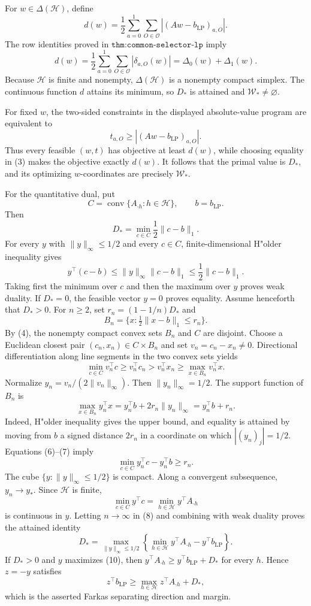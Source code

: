 For \(w\in\Delta(\mathcal H)\), define
\[
d(w)=\frac12\sum_{a=0}^1\sum_{O\in\mathcal O}|(Aw-b_{\mathrm{LP}})_{a,O}|.
\tag{1}
\]
The row identities proved in \(\texttt{thm:common-selector-lp}\) imply
\[
d(w)=\frac12\sum_{a=0}^1\sum_{O\in\mathcal O}|\delta_{a,O}(w)|=\Delta_0(w)+\Delta_1(w).
\tag{2}
\]
Because \(\mathcal H\) is finite and nonempty, \(\Delta(\mathcal H)\) is a nonempty compact simplex. The continuous function \(d\) attains its minimum, so \(D_*\) is attained and \(\mathcal W_*\ne\varnothing\).

For fixed \(w\), the two-sided constraints in the displayed absolute-value program are equivalent to
\[
t_{a,O}\ge |(Aw-b_{\mathrm{LP}})_{a,O}|.
\tag{3}
\]
Thus every feasible \((w,t)\) has objective at least \(d(w)\), while choosing equality in (3) makes the objective exactly \(d(w)\). It follows that the primal value is \(D_*\), and its optimizing \(w\)-coordinates are precisely \(\mathcal W_*\).

For the quantitative dual, put
\[
C=\operatorname{conv}\{A_{\cdot h}:h\in\mathcal H\},\qquad b=b_{\mathrm{LP}}.
\]
Then
\[
D_*=\min_{c\in C}\frac12\lVert c-b\rVert_1.
\tag{4}
\]
For every \(y\) with \(\lVert y\rVert_\infty\le1/2\) and every \(c\in C\), finite-dimensional H"older inequality gives
\[
y^\top(c-b)\le\lVert y\rVert_\infty\lVert c-b\rVert_1\le\frac12\lVert c-b\rVert_1.
\tag{5}
\]
Taking first the minimum over \(c\) and then the maximum over \(y\) proves weak duality. If \(D_*=0\), the feasible vector \(y=0\) proves equality. Assume henceforth that \(D_*>0\). For \(n\ge2\), set \(r_n=(1-1/n)D_*\) and
\[
B_n=\{x:\tfrac12\lVert x-b\rVert_1\le r_n\}.
\]
By (4), the nonempty compact convex sets \(B_n\) and \(C\) are disjoint. Choose a Euclidean closest pair \((c_n,x_n)\in C\times B_n\) and set \(v_n=c_n-x_n\ne0\). Directional differentiation along line segments in the two convex sets yields
\[
\min_{c\in C}v_n^\top c\ge v_n^\top c_n>v_n^\top x_n\ge\max_{x\in B_n}v_n^\top x.
\tag{6}
\]
Normalize \(y_n=v_n/(2\lVert v_n\rVert_\infty)\). Then \(\lVert y_n\rVert_\infty=1/2\). The support function of \(B_n\) is
\[
\max_{x\in B_n}y_n^\top x=y_n^\top b+2r_n\lVert y_n\rVert_\infty=y_n^\top b+r_n.
\tag{7}
\]
Indeed, H"older inequality gives the upper bound, and equality is attained by moving from \(b\) a signed distance \(2r_n\) in a coordinate on which \(|(y_n)_j|=1/2\). Equations (6)--(7) imply
\[
\min_{c\in C}y_n^\top c-y_n^\top b\ge r_n.
\tag{8}
\]
The cube \(\{y:\lVert y\rVert_\infty\le1/2\}\) is compact. Along a convergent subsequence, \(y_n\to y_*\). Since \(\mathcal H\) is finite,
\[
\min_{c\in C}y^\top c=\min_{h\in\mathcal H}y^\top A_{\cdot h}
\tag{9}
\]
is continuous in \(y\). Letting \(n\to\infty\) in (8) and combining with weak duality proves the attained identity
\[
D_*=\max_{\lVert y\rVert_\infty\le1/2}\left\{\min_{h\in\mathcal H}y^\top A_{\cdot h}-y^\top b_{\mathrm{LP}}\right\}.
\tag{10}
\]
If \(D_*>0\) and \(y\) maximizes (10), then \(y^\top A_{\cdot h}\ge y^\top b_{\mathrm{LP}}+D_*\) for every \(h\). Hence \(z=-y\) satisfies
\[
z^\top b_{\mathrm{LP}}\ge\max_{h\in\mathcal H}z^\top A_{\cdot h}+D_*,
\tag{11}
\]
which is the asserted Farkas separating direction and margin.

